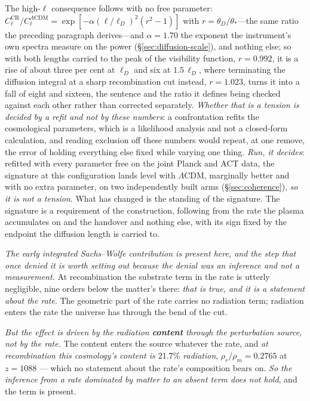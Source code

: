 \documentclass[11pt,a4paper]{article}
\theoremstyle{plain}
\theoremstyle{definition}
\theoremstyle{remark}
\begin{document}
The high-$\ell$ consequence follows with no free parameter:
$C_{\ell}^{\mathrm{CR}}/C_{\ell}^{\Lambda\mathrm{CDM}}
=\exp[-\alpha(\ell/\ell_{D})^{2}(r^{2}-1)]$ with $r=\theta_{D}/\theta_{*}$---the same ratio the preceding
paragraph derives---and $\alpha=1.70$ the exponent the instrument's own spectra measure on the power
(\S\ref{sec:diffusion-scale}), and nothing else; so with both lengths carried to the peak of the
visibility function, $r=0.992$, it is a rise of about three per cent at $\ell_{D}$ and six at
$1.5\,\ell_{D}$, where terminating the diffusion integral at a sharp recombination cut instead, $r=1.023$,
turns it into a fall of eight and sixteen, the sentence and the ratio it defines being checked against each other rather than corrected separately.
\emph{Whether that is a tension is decided by a refit and not by these numbers}: a
confrontation refits the cosmological parameters, which is a likelihood analysis and not a closed-form
calculation, and reading exclusion off these numbers would repeat, at one remove, the error of holding
everything else fixed while varying one thing. \emph{Run, it decides}: refitted with every parameter free on
the joint Planck and ACT data, the signature at this configuration lands level with $\Lambda$CDM, marginally
better and with no extra parameter, on two independently built arms (\S\ref{sec:coherence}), \emph{so it is
not a tension}. What has changed is the standing of the signature. The signature is a requirement of the construction, following from the rate the plasma accumulates on and the handover and nothing else, with its sign fixed by the endpoint the diffusion length is carried to.

\emph{The early integrated Sachs--Wolfe contribution is present here, and the step that once denied it is
worth setting out because the denial was an inference and not a measurement.} At recombination the substrate
term in the rate is utterly negligible, nine orders below the matter's
there: \emph{that is true, and it is a statement about the rate}. The geometric part of the
rate carries no radiation term; radiation enters the rate the universe has through the bend of the cut.

\emph{But the effect is driven by the radiation \textbf{content} through the perturbation source, not by the
rate.} The content enters the source whatever the rate, and \emph{at recombination this
cosmology's content is $21.7\%$ radiation}, $\rho_r/\rho_m=0.2765$ at $z=1088$ --- which no statement about
the rate's composition bears on. \emph{So the inference from a rate dominated by matter to an absent term does not
hold}, and the term is present.
\end{document}

